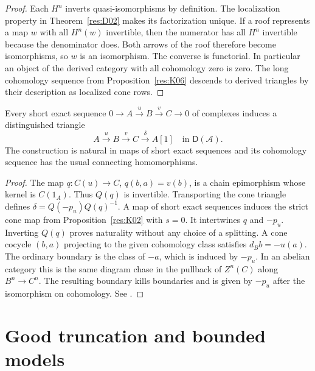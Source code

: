 \begin{proof}
Each \(H^n\) inverts quasi-isomorphisms by definition. The localization
property in Theorem~\ref{res:D02} makes its factorization unique.
If a roof represents a map \(w\) with all \(H^n(w)\) invertible, then
the numerator has all \(H^n\) invertible because the denominator does.
Both arrows of the roof therefore become isomorphisms, so \(w\) is an
isomorphism. The converse is functorial. In particular an object of
the derived category with all cohomology zero is zero.
The long cohomology sequence from Proposition~\ref{res:K06} descends
to derived triangles by their description as localized cone rows.
\end{proof}

\begin{theorem}\label{res:D04}
Every short exact sequence \(0\to A\xrightarrow{u}B\xrightarrow{v}C
\to0\) of complexes induces a distinguished triangle
\[
 A\xrightarrow{u}B\xrightarrow{v}C
   \xrightarrow{\delta}A[1]\quad\text{in }\mathsf D(\mathcal A).
\]
The construction is natural in maps of short exact sequences and its
cohomology sequence has the usual connecting homomorphisms.
\end{theorem}
\begin{proof}
The map \(q:C(u)\to C\), \(q(b,a)=v(b)\), is a chain epimorphism
whose kernel is \(C(1_A)\). Thus \(Q(q)\) is invertible. Transporting
the cone triangle defines
\(\delta=Q(-p_u)Q(q)^{-1}\). A map of short exact sequences induces
the strict cone map from Proposition~\ref{res:K02} with \(s=0\).
It intertwines \(q\) and \(-p_u\). Inverting \(Q(q)\) proves
naturality without any choice of a splitting. A cone cocycle
\((b,a)\) projecting to the given cohomology class satisfies
\(d_Bb=-u(a)\). The ordinary boundary is the class of \(-a\),
which is induced by \(-p_u\). In an abelian category this is the
same diagram chase in the pullback of \(Z^n(C)\) along \(B^n\to
C^n\). The resulting boundary kills boundaries and is given by
\(-p_u\) after the isomorphism on cohomology.
See \cite[Tag 0152]{stacks-derived}.
\end{proof}

\section{Good truncation and bounded models}

